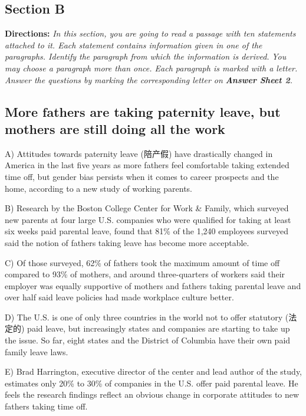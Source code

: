 \documentclass[UTF8,11pt]{ctexart}
\begin{document}
\subsection*{\textbf{Section B}}


\textbf{Directions:} \textit{In this section, you are going to read a passage with ten statements attached to it. Each statement} \textit{contains information given in one of the paragraphs. Identify the paragraph from which the information is derived.} \textit{You may choose a paragraph more than once. Each paragraph is marked with a letter. Answer the questions by} \textit{marking the corresponding letter on }\textbf{\textit{Answer Sheet 2}}\textit{.}


\subsection*{\textbf{More fathers are taking paternity leave, but mothers are still doing all the work}}


A) Attitudes towards paternity leave (陪产假) have drastically changed in America in the last five years as more fathers feel comfortable taking extended time off, but gender bias persists when it comes to career prospects and the home, according to a new study of working parents.


B) Research by the Boston College Center for Work \& Family, which surveyed new parents at four large U.S. companies who were qualified for taking at least six weeks paid parental leave, found that 81\% of the 1,240 employees surveyed said the notion of fathers taking leave has become more acceptable.


C) Of those surveyed, 62\% of fathers took the maximum amount of time off compared to 93\% of mothers, and around three-quarters of workers said their employer was equally supportive of mothers and fathers taking parental leave and over half said leave policies had made workplace culture better.


D) The U.S. is one of only three countries in the world not to offer statutory (法定的) paid leave, but increasingly states and companies are starting to take up the issue. So far, eight states and the District of Columbia have their own paid family leave laws.


E) Brad Harrington, executive director of the center and lead author of the study, estimates only 20\% to 30\% of companies in the U.S. offer paid parental leave. He feels the research findings reflect an obvious change in corporate attitudes to new fathers taking time off.
\end{document}
